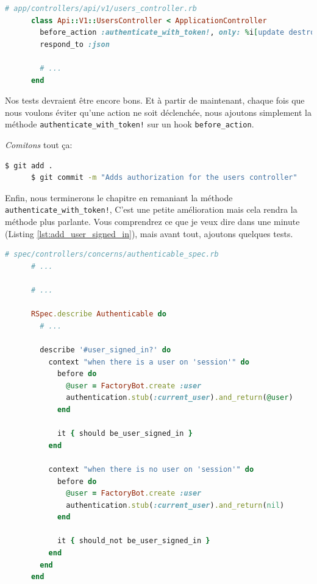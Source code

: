 \documentclass[]{report}
\begin{document}
    \begin{scriptsize}
      \begin{lstlisting}[language=ruby, caption={Utilisation de la méthode before\_action pour le controlleur des utilisateurs}, label={lst:add_before_action_to_users}]
      # app/controllers/api/v1/users_controller.rb
      class Api::V1::UsersController < ApplicationController
        before_action :authenticate_with_token!, only: %i[update destroy]
        respond_to :json

        # ...
      end
      \end{lstlisting}
    \end{scriptsize}

    Nos tests devraient être encore bons. Et à partir de maintenant, chaque fois que nous voulons éviter qu'une action ne soit déclenchée, nous ajoutons simplement la méthode \verb|authenticate_with_token!| sur un hook \verb|before_action|.

    \textit{Comitons} tout ça:

    \begin{scriptsize}
      \begin{lstlisting}[language=bash]
      $ git add .
      $ git commit -m "Adds authorization for the users controller"
      \end{lstlisting}
    \end{scriptsize}

    Enfin, nous terminerons le chapitre en remaniant la méthode \verb|authenticate_with_token!|, C'est une petite amélioration mais cela rendra la méthode plus parlante. Vous comprendrez ce que je veux dire dans une minute (Listing \ref{lst:add_user_signed_in}), mais avant tout, ajoutons quelques tests.

    \begin{scriptsize}
      \begin{lstlisting}[language=ruby, caption={Création du test user\_signed\_in?}, label={lst:add_user_signed_in_test}]
      # spec/controllers/concerns/authenticable_spec.rb
      # ...

      # ...

      RSpec.describe Authenticable do
        # ...

        describe '#user_signed_in?' do
          context "when there is a user on 'session'" do
            before do
              @user = FactoryBot.create :user
              authentication.stub(:current_user).and_return(@user)
            end

            it { should be_user_signed_in }
          end

          context "when there is no user on 'session'" do
            before do
              @user = FactoryBot.create :user
              authentication.stub(:current_user).and_return(nil)
            end

            it { should_not be_user_signed_in }
          end
        end
      end
      \end{lstlisting}
    \end{scriptsize}
\end{document}
